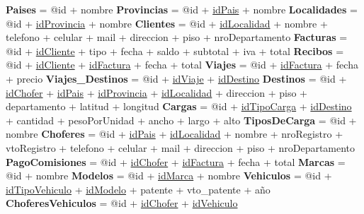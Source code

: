 \documentclass{article}
\begin{document}
\begin{flushleft}
  \textbf{Paises}                        = @id + nombre
  \newline  \textbf{Provincias}          = @id + \underline{idPais}      + nombre
  \newline  \textbf{Localidades}         = @id + \underline{idProvincia} + nombre
  \newline  \textbf{Clientes}            = @id + \underline{idLocalidad} + nombre + telefono + celular + mail + direccion + piso + nroDepartamento
  \newline  \textbf{Facturas}            = @id + \underline{idCliente} + tipo + fecha + saldo + subtotal + iva + total %
  \newline  \textbf{Recibos}             = @id + \underline{idCliente} + \underline{idFactura} + fecha + total
  \newline
  \newline  \textbf{Viajes}              = @id + \underline{idFactura} + fecha + precio
  \newline  \textbf{Viajes\_Destinos}    = @id + \underline{idViaje} + \underline{idDestino}
  \newline  \textbf{Destinos}            = @id + \underline{idChofer} + \underline{idPais} + \underline{idProvincia} + \underline{idLocalidad} + direccion + piso + departamento + latitud + longitud
  \newline  \textbf{Cargas}              = @id + \underline{idTipoCarga} + \underline{idDestino} + cantidad + pesoPorUnidad + ancho + largo + alto
  \newline  \textbf{TiposDeCarga}        = @id + nombre
  \newline  \textbf{Choferes}            = @id + \underline{idPais} + \underline{idLocalidad} + nombre + nroRegistro + vtoRegistro + telefono + celular + mail + direccion + piso + nroDepartamento
  \newline  \textbf{PagoComisiones}      = @id + \underline{idChofer} + \underline{idFactura} + fecha + total
  \newline
  \newline  \textbf{Marcas}              = @id + nombre
  \newline  \textbf{Modelos}             = @id + \underline{idMarca} + nombre
  \newline  \textbf{Vehiculos}           = @id + \underline{idTipoVehiculo} + \underline{idModelo} + patente + vto\_patente + año
  \newline  \textbf{ChoferesVehiculos}   = @id + \underline{idChofer} + \underline{idVehiculo}
\end{flushleft}
\end{document}
